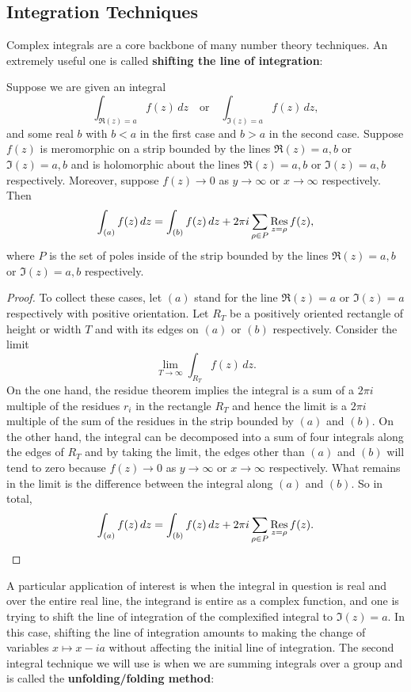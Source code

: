     \subsection*{Integration Techniques}
      Complex integrals are a core backbone of many number theory techniques. An extremely useful one is called \textbf{shifting the line of integration}:

      \begin{theorem*}
        Suppose we are given an integral
        \[
          \int_{\Re(z) = a}f(z)\,dz \quad \text{or} \quad \int_{\Im(z) = a}f(z)\,dz,
        \]
        and some real $b$ with $b < a$ in the first case and $b > a$ in the second case. Suppose $f(z)$ is meromorphic on a strip bounded by the lines $\Re(z) = a,b$ or $\Im(z) = a,b$ and is holomorphic about the lines $\Re(z) = a,b$ or $\Im(z) = a,b$ respectively. Moreover, suppose $f(z) \to 0$ as $y \to \infty$ or $x \to \infty$ respectively. Then
        \[
          \int_{(a)}f(z)\,dz = \int_{(b)}f(z)\,dz+2\pi i\sum_{\rho \in P}\operatorname*{\mathrm{Res}}_{z = \rho}f(z),
        \]
        where $P$ is the set of poles inside of the strip bounded by the lines $\Re(z) = a,b$ or $\Im(z) = a,b$ respectively.
      \end{theorem*}
      \begin{proof}
        To collect these cases, let $(a)$ stand for the line $\Re(z) = a$ or $\Im(z) = a$ respectively with positive orientation. Let $R_{T}$ be a positively oriented rectangle of height or width $T$ and with its edges on $(a)$ or $(b)$ respectively. Consider the limit
        \[
          \lim_{T \to \infty}\int_{R_{T}}f(z)\,dz.
        \]
        On the one hand, the residue theorem implies the integral is a sum of a $2\pi i$ multiple of the residues $r_{i}$ in the rectangle $R_{T}$ and hence the limit is a $2\pi i$ multiple of the sum of the residues in the strip bounded by $(a)$ and $(b)$. On the other hand, the integral can be decomposed into a sum of four integrals along the edges of $R_{T}$ and by taking the limit, the edges other than $(a)$ and $(b)$ will tend to zero because $f(z) \to 0$ as $y \to \infty$ or $x \to \infty$ respectively. What remains in the limit is the difference between the integral along $(a)$ and $(b)$. So in total,
        \[
          \int_{(a)}f(z)\,dz = \int_{(b)}f(z)\,dz+2\pi i\sum_{\rho \in P}\operatorname*{\mathrm{Res}}_{z = \rho}f(z).
        \]
      \end{proof}

      A particular application of interest is when the integral in question is real and over the entire real line, the integrand is entire as a complex function, and one is trying to shift the line of integration of the complexified integral to $\Im(z) = a$. In this case, shifting the line of integration amounts to making the change of variables $x \mapsto x-ia$ without affecting the initial line of integration. The second integral technique we will use is when we are summing integrals over a group and is called the \textbf{unfolding/folding method}:

